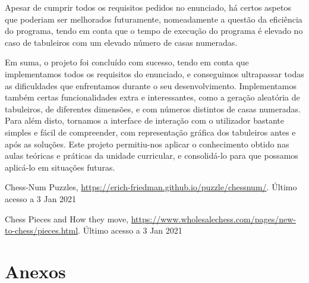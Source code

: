 \documentclass[runningheads]{llncs}
\begin{document}
Apesar de cumprir todos os requisitos pedidos no enunciado, há certos aspetos que poderiam ser melhorados futuramente, nomeadamente a questão da eficiência do programa, tendo em conta que o tempo de execução do programa
é elevado no caso de tabuleiros com um elevado número de casas numeradas.

Em suma, o projeto foi concluído com sucesso, tendo em conta que implementamos todos os requisitos do enunciado, e conseguimos ultrapassar todas as dificuldades que enfrentamos durante o seu desenvolvimento.
Implementamos também certas funcionalidades extra e interessantes, como a geração aleatória de tabuleiros, de diferentes dimensões, e com números distintos de casas numeradas. Para além disto, tornamos a interface de interação com o utilizador bastante simples e fácil de compreender,
com representação gráfica dos tabuleiros antes e após as soluções. Este projeto permitiu-nos aplicar o conhecimento obtido nas aulas teóricas e práticas da unidade curricular, e consolidá-lo para que possamos aplicá-lo em situações futuras.

%
%

\begin{thebibliography}{8}
Chess-Num Puzzles, \url{https://erich-friedman.github.io/puzzle/chessnum/}. Último acesso a 3
Jan 2021

Chess Pieces and How they move, \url{https://www.wholesalechess.com/pages/new-to-chess/pieces.html}. Último acesso a 3
Jan 2021

\end{thebibliography}

\section{Anexos}
\end{document}
